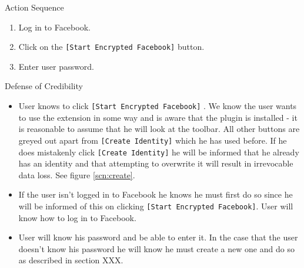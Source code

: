 \begin{desc}

    \item[Action Sequence] \hfill
    
    \begin{enumerate}
        \item Log in to Facebook.
        \item Click on the {\tt [Start Encrypted Facebook]} button.
        \item Enter user password.
    \end{enumerate}
    
    \item[Defense of Credibility] \hfill
        \begin{itemize}
            
            \item User knows to click {\tt [Start Encrypted Facebook]} . We know the user wants to use the extension in some way and is aware that the plugin is installed - it is reasonable to assume that he will look at the toolbar. All other buttons are greyed out apart from {\tt [Create Identity]} which he has used before. If he does mistakenly click {\tt [Create Identity]} he will be informed that he already has an identity and that attempting to overwrite it will result in irrevocable data loss. See figure \ref{scn:create}.
            
            \item If the user isn't logged in to Facebook he knows he must first do so since he will be informed of this on clicking {\tt [Start Encrypted Facebook]}. User will know how to log in to Facebook.
            
            \item User will know his password and be able to enter it. In the case that the user doesn't know his password he will know he must create a new one and do so as described in section XXX.
            
        \end{itemize}
\end{desc}

